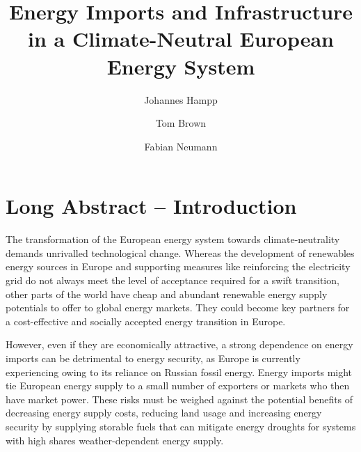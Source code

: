 \documentclass[10pt,5p,reversenotenum,lefttitle]{elsarticle}
\begin{document}
\begin{frontmatter}

	\title{Energy Imports and Infrastructure in a Climate-Neutral European Energy System}
    
	\author[jlu]{Johannes Hampp}
    \author[tub]{Tom Brown}
	\author[tub]{Fabian Neumann}
	\address[jlu]{Center for International Development and Environmental Research, Justus-Liebig-University Gießen, Gießen, Germany}
	\address[tub]{Department of Digital Transformation in Energy Systems, Institute of Energy Technology, Technische Universität Berlin, Fakultät III, Einsteinufer 25 (TA 8), 10587 Berlin, Germany}

\end{frontmatter}

\section*{Long Abstract -- Introduction}

The transformation of the European energy system towards climate-neutrality
demands unrivalled technological change. Whereas the development of renewables
energy sources in Europe and supporting measures like reinforcing the
electricity grid do not always meet the level of acceptance required for a swift
transition, other parts of the world have cheap and abundant renewable energy
supply potentials to offer to global energy
markets.\cite{irenaGlobalHydrogen2022,luxSupplyCurves2021,vanderzwaanTimmermansDream2021,fasihiLongTermHydrocarbon2017,reichenbergDeepDecarbonization2022,galvanExportingSunshine2022,armijoFlexibleProduction2020,pfennigGlobalGISbased2022}
They could become key partners for a cost-effective and socially accepted energy
transition in Europe.

However, even if they are economically attractive, a strong dependence on energy
imports can be detrimental to energy security, as Europe is currently
experiencing owing to its reliance on Russian fossil
energy.\cite{pedersenLongtermImplications2022} Energy imports might tie European
energy supply to a small number of exporters or markets who then have market
power. These risks must be weighed against the potential benefits of decreasing
energy supply costs, reducing land usage and increasing energy security by
supplying storable fuels that can mitigate energy droughts for systems with high
shares weather-dependent energy supply.
\end{document}
